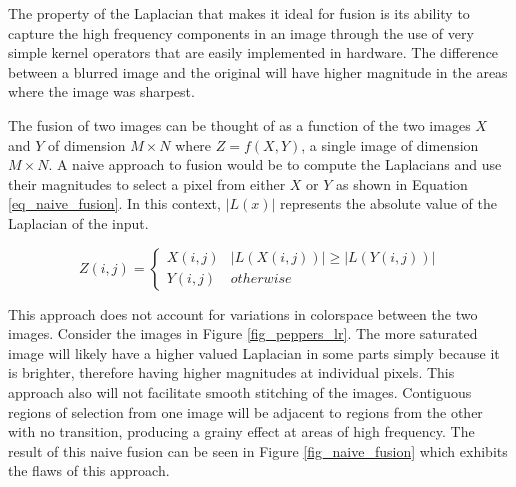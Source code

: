\documentclass{article}
\begin{document}
The property of the Laplacian that makes it ideal for fusion is its ability to capture the high frequency components in an image through the use of very simple kernel operators that are easily implemented in hardware. The difference between a blurred image and the original will have higher magnitude in the areas where the image was sharpest.

The fusion of two images can be thought of as a function of the two images $X$ and $Y$ of dimension $M \times N$ where $Z = f(X, Y)$, a single image of dimension $M \times N$. A naive approach to fusion would be to compute the Laplacians and use their magnitudes to select a pixel from either $X$ or $Y$ as shown in Equation \ref{eq_naive_fusion}. In this context, $|L(x)|$ represents the absolute value of the Laplacian of the input.

\begin{equation}
Z(i,j)=
\begin{cases}
X(i,j) & |L(X(i,j))| \ge |L(Y(i,j))| \\
Y(i,j) & otherwise
\end{cases}
\label{eq_naive_fusion}
\end{equation}

This approach does not account for variations in colorspace between the two images. Consider the images in Figure \ref{fig_peppers_lr}. The more saturated image will likely have a higher valued Laplacian in some parts simply because it is brighter, therefore having higher magnitudes at individual pixels. This approach also will not facilitate smooth stitching of the images. Contiguous regions of selection from one image will be adjacent to regions from the other with no transition, producing a grainy effect at areas of high frequency. The result of this naive fusion can be seen in Figure \ref{fig_naive_fusion} which exhibits the flaws of this approach.
\end{document}
